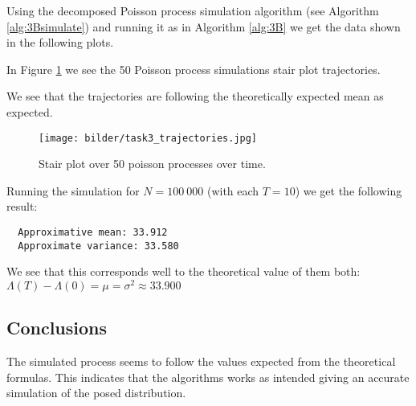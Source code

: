 Using the decomposed Poisson process simulation algorithm (see Algorithm \ref{alg:3Bsimulate}) and running it as in Algorithm \ref{alg:3B} we get the data shown in the following plots.


In Figure \ref{fig:t3stair} we see the 50 Poisson process simulations stair plot trajectories.

We see that the trajectories are following the theoretically expected mean as expected.


\begin{figure}[H]
    \centering
    \texttt{[image: bilder/task3\_trajectories.jpg]}
    \caption{Stair plot over 50 poisson processes over time.}
    \label{fig:t3stair}
\end{figure}

Running the simulation for $N = 100\ 000$ (with each $T = 10$) we get the following result:
\begin{verbatim}
  Approximative mean: 33.912
  Approximate variance: 33.580
\end{verbatim}
\label{res:ex3c}
We see that this corresponds well to the theoretical value of them both: $\Lambda(T) - \Lambda(0) = \mu = \sigma^2 \approx 33.900$

\subsection{Conclusions}
\label{sec:conc3}
The simulated process seems to follow the values expected from the theoretical formulas.
This indicates that the algorithms works as intended giving an accurate simulation of the posed distribution.



\newpage
\appendix


\clearpage
